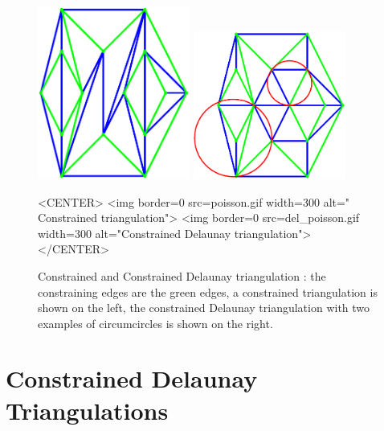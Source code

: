 \begin{figure}
\begin{ccTexOnly}
\begin{center}
\includegraphics[width=5cm]{poisson.ps}
\includegraphics[width=5cm]{del_poisson.ps}
\end{center}
\end{ccTexOnly}
\caption{Constrained and Constrained Delaunay triangulation : 
 the constraining edges are the green edges,  a constrained
triangulation is shown on the left, the constrained Delaunay
triangulation with two examples of circumcircles is shown on the right.}
\label{2D_Triangulation_Fig_constrained}
\begin{ccHtmlOnly}
<CENTER>
<img border=0 src=poisson.gif width=300 alt=" Constrained triangulation">
<img border=0 src=del_poisson.gif width=300 alt="Constrained Delaunay triangulation">
</CENTER>
\end{ccHtmlOnly}
\end{figure}


\section{Constrained Delaunay Triangulations}
\label{Section_2D_Triangulations_Constrained_Delaunay}

